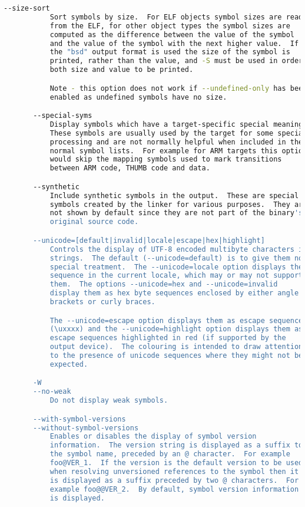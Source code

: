 {{\begin{lstlisting}[language=bash]
       --size-sort
           Sort symbols by size.  For ELF objects symbol sizes are read
           from the ELF, for other object types the symbol sizes are
           computed as the difference between the value of the symbol
           and the value of the symbol with the next higher value.  If
           the "bsd" output format is used the size of the symbol is
           printed, rather than the value, and -S must be used in order
           both size and value to be printed.

           Note - this option does not work if --undefined-only has been
           enabled as undefined symbols have no size.

       --special-syms
           Display symbols which have a target-specific special meaning.
           These symbols are usually used by the target for some special
           processing and are not normally helpful when included in the
           normal symbol lists.  For example for ARM targets this option
           would skip the mapping symbols used to mark transitions
           between ARM code, THUMB code and data.

       --synthetic
           Include synthetic symbols in the output.  These are special
           symbols created by the linker for various purposes.  They are
           not shown by default since they are not part of the binary's
           original source code.

       --unicode=[default|invalid|locale|escape|hex|highlight]
           Controls the display of UTF-8 encoded multibyte characters in
           strings.  The default (--unicode=default) is to give them no
           special treatment.  The --unicode=locale option displays the
           sequence in the current locale, which may or may not support
           them.  The options --unicode=hex and --unicode=invalid
           display them as hex byte sequences enclosed by either angle
           brackets or curly braces.

           The --unicode=escape option displays them as escape sequences
           (\uxxxx) and the --unicode=highlight option displays them as
           escape sequences highlighted in red (if supported by the
           output device).  The colouring is intended to draw attention
           to the presence of unicode sequences where they might not be
           expected.

       -W
       --no-weak
           Do not display weak symbols.

       --with-symbol-versions
       --without-symbol-versions
           Enables or disables the display of symbol version
           information.  The version string is displayed as a suffix to
           the symbol name, preceded by an @ character.  For example
           foo@VER_1.  If the version is the default version to be used
           when resolving unversioned references to the symbol then it
           is displayed as a suffix preceded by two @ characters.  For
           example foo@@VER_2.  By default, symbol version information
           is displayed.


\end{lstlisting}}}
